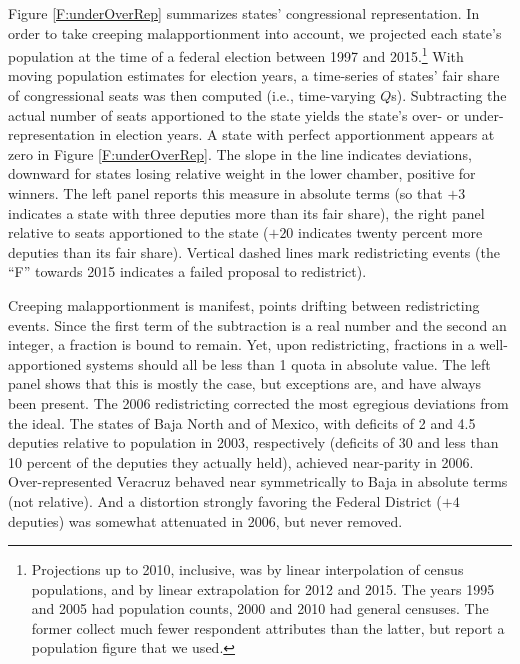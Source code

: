 \documentclass[letter,12pt]{article}
\begin{document}
Figure \ref{F:underOverRep} summarizes states' congressional representation. In order to take creeping malapportionment into account, we projected each state's population at the time of a federal election between 1997 and 2015.\footnote{Projections up to 2010, inclusive, was by linear interpolation of census populations, and by linear extrapolation for 2012 and 2015. The years 1995 and 2005 had population counts, 2000 and 2010 had general censuses. The former collect much fewer respondent attributes than the latter, but report a population figure that we used.} With moving population estimates for election years, a time-series of states' fair share of congressional seats was then computed (i.e., time-varying $Q$s). Subtracting the actual number of seats apportioned to the state yields the state's over- or under-representation in election years. A state with perfect apportionment appears at zero in Figure \ref{F:underOverRep}. The slope in the line indicates deviations, downward for states losing relative weight in the lower chamber, positive for winners. The left panel reports this measure in absolute terms (so that $+3$ indicates a state with three deputies more than its fair share), the right panel relative to seats apportioned to the state ($+20$ indicates twenty percent more deputies than its fair share). Vertical dashed lines mark redistricting events (the ``F'' towards 2015 indicates a failed proposal to redistrict). 

Creeping malapportionment is manifest, points drifting between redistricting events. Since the first term of the subtraction is a real number and the second an integer, a fraction is bound to remain. Yet, upon redistricting, fractions in a well-apportioned systems should all be less than 1 quota in absolute value. The left panel shows that this is mostly the case, but exceptions are, and have always been present. The 2006 redistricting corrected the most egregious deviations from the ideal. The states of Baja North and of Mexico, with deficits of 2 and 4.5 deputies relative to population in 2003, respectively (deficits of 30 and less than 10 percent of the deputies they actually held), achieved near-parity in 2006. Over-represented Veracruz behaved near symmetrically to Baja in absolute terms (not relative). And a distortion strongly favoring the Federal District ($+4$ deputies) was somewhat attenuated in 2006, but never removed. 
\end{document}
